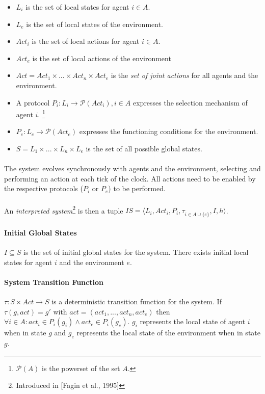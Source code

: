 \documentclass{article}
\theoremstyle{plain}
\theoremstyle{definition}
\begin{document}
\begin{multicols}{2}
\begin{itemize}
\item $L_i$ is the set of local states for agent $i \in A$.
\item $L_e$ is the set of local states of the environment.
\item $Act_i$ is the set of local actions for agent $i \in A$.
\item $Act_e$ is the set of local actions of the environment
\item $Act = Act_1 \times ... \times Act_n \times Act_e$ is the \textit{set of joint actions} for all agents and the environment.
\item A protocol $P_i: L_i \rightarrow \mathcal{P}(Act_i), i \in A$ expresses the selection mechanism of agent $i$. \footnote{$\mathcal{P}(A)$ is the powerset of the set $A$.}
\item $P_e: L_e \rightarrow \mathcal{P}(Act_e)$ expresses the functioning conditions for the environment.
\item $S = L_1 \times ... \times L_n \times L_e$ is the set of all possible global states.
\end{itemize}

\paragraph{} The system evolves synchronously with agents and the environment, selecting and performing an action at each tick of the clock. All actions need to be enabled by the respective protocols ($P_i$ or $P_e$) to be performed. 

\paragraph{} An \textit{interpreted system}\footnote{Introduced in [Fagin et al., 1995]} is then a tuple $IS = \langle {L_i, Act_i, P_i, \tau}_{i \in A\cup\{e\}}, I, h \rangle$.

\paragraph{Initial Global States} $I \subseteq S$ is the set of initial global states for the system. There exists initial local states for agent $i$ and the environment $e$.

\paragraph{System Transition Function} $\tau: S \times Act \rightarrow S$ is a deterministic transition function for the system. If $\tau(g, act) = g'$ with $act = (act_1, ..., act_n, act_e)$ then $\forall i \in A: act_i \in P_i(g_i) \land act_e \in P_i(g_e)$. $g_i$ represents the local state of agent $i$ when in state $g$ and $g_e$ represents the local state of the environment when in state $g$.


\end{multicols}
\end{document}
